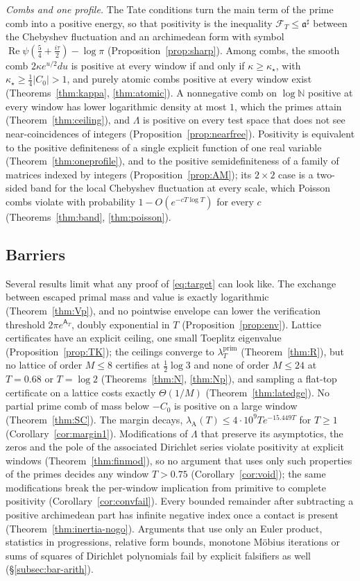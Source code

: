 \documentclass[11pt]{amsart}
\theoremstyle{definition}
\theoremstyle{remark}
\newcommand{\N}{\mathbb N}
\newcommand{\Rel}{\operatorname{Re}}
\newcommand{\lamP}{\lambda^{\mathrm{prim}}_T}
\newcommand{\lamA}{\lambda_{\mathrm A}(T)}
\newcommand{\Aconst}{\mathsf A_T}
\begin{document}
\emph{Combs and one profile.} The Tate conditions turn the main term of the prime comb into a positive energy, so that
positivity is the inequality $\mathcal F_T\le\mathfrak a^\sharp$ between the Chebyshev fluctuation and an archimedean form with
symbol $\Rel\psi(\frac54+\frac{i\tau}2)-\log\pi$ (Proposition~\ref{prop:sharp}). Among combs, the smooth comb $2\kappa e^{u/2}du$ is
positive at every window if and only if $\kappa\ge\kappa_\star$, with $\kappa_\star\ge\frac14|C_0|>1$, and purely atomic combs positive
at every window exist (Theorems~\ref{thm:kappa}, \ref{thm:atomic}). A nonnegative comb on $\log\N$ positive at every window has
lower logarithmic density at most $1$, which the primes attain (Theorem~\ref{thm:ceiling}), and $\Lambda$ is positive on every test space that does not
see near-coincidences of integers (Proposition~\ref{prop:nearfree}). Positivity is equivalent to the positive definiteness of a single
explicit function of one real variable (Theorem~\ref{thm:oneprofile}), and to the positive semidefiniteness of a family of matrices
indexed by integers (Proposition~\ref{prop:AM}); its $2\times2$ case is a two-sided band for the local Chebyshev fluctuation at
every scale, which Poisson combs violate with probability $1-O(e^{-cT\log T})$ for every $c$ (Theorems~\ref{thm:band},
\ref{thm:poisson}).

\subsection{Barriers}
Several results limit what any proof of \eqref{eq:target} can look like. The exchange between escaped
primal mass and value is exactly logarithmic (Theorem~\ref{thm:Vp}), and no pointwise envelope can lower
the verification threshold $2\pi e^{\Aconst}$, doubly exponential in $T$ (Proposition~\ref{prop:env}).
Lattice certificates have an explicit ceiling, one small Toeplitz eigenvalue (Proposition~\ref{prop:TK});
the ceilings converge to $\lamP$ (Theorem~\ref{thm:R}), but no lattice of order $M\le8$ certifies at
$\frac12\log3$ and none of order $M\le24$ at $T=0.68$ or $T=\log2$ (Theorems~\ref{thm:N}, \ref{thm:Np}),
and sampling a flat-top certificate on a lattice costs exactly $\Theta(1/M)$
(Theorem~\ref{thm:latedge}). No partial prime comb of mass below $-C_0$ is positive on a large window
(Theorem~\ref{thm:SC}). The margin decays, $\lamA\le4\cdot10^9Te^{-15.449T}$ for $T\ge1$
(Corollary~\ref{cor:margin1}). Modifications of $\Lambda$ that preserve its asymptotics, the zeros and the
pole of the associated Dirichlet series violate positivity at explicit windows (Theorem~\ref{thm:finmod}), so
no argument that uses only such properties of the primes decides any window $T>0.75$
(Corollary~\ref{cor:void}); the same modifications break the per-window implication from primitive to
complete positivity (Corollary~\ref{cor:convfail}). Every bounded remainder after subtracting a positive
archimedean part has infinite negative index once a contact is present (Theorem~\ref{thm:inertia-nogo}).
Arguments that use only an Euler product, statistics in progressions, relative form bounds, monotone M\"obius iterations or
sums of squares of Dirichlet polynomials fail by explicit falsifiers as well (\S\ref{subsec:bar-arith}).
\end{document}
